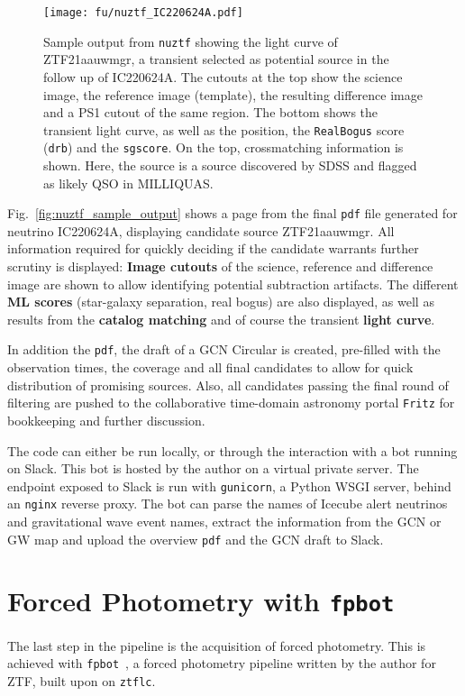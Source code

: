 \begin{figure}[h!]
    \texttt{[image: fu/nuztf\_IC220624A.pdf]}
    \caption[\texttt{nuztf} output]{Sample output from \texttt{nuztf} showing the light curve of ZTF21aauwmgr, a transient selected as potential source in the follow up of IC220624A. The cutouts at the top show the science image, the reference image (template), the resulting difference image and a PS1 cutout of the same region. The bottom shows the transient light curve, as well as the position, the \texttt{RealBogus} score (\texttt{drb}) and the \texttt{sgscore}. On the top, crossmatching information is shown. Here, the source is a source discovered by SDSS and flagged as likely QSO in MILLIQUAS.}
\end{figure}
Fig.~\ref{fig:nuztf_sample_output} shows a page from the final \texttt{pdf} file generated for neutrino IC220624A, displaying candidate source ZTF21aauwmgr. All information required for quickly deciding if the candidate warrants further scrutiny is displayed: \textbf{Image cutouts} of the science, reference and difference image are shown to allow identifying potential subtraction artifacts. The different \textbf{ML scores} (star-galaxy separation, real bogus) are also displayed, as well as results from the \textbf{catalog matching} and of course the transient \textbf{light curve}.

In addition the \texttt{pdf}, the draft of a GCN Circular is created, pre-filled with the observation times, the coverage and all final candidates to allow for quick distribution of promising sources. Also, all candidates passing the final round of filtering are pushed to the collaborative time-domain astronomy portal \texttt{Fritz} for bookkeeping and further discussion.

The code can either be run locally, or through the interaction with a bot running on Slack. This bot is hosted by the author on a virtual private server. The endpoint exposed to Slack is run with \texttt{gunicorn}, a Python WSGI server, behind an \texttt{nginx} reverse proxy. The bot can parse the names of Icecube alert neutrinos and gravitational wave event names, extract the information from the GCN or GW map and upload the overview \texttt{pdf} and the GCN draft to Slack.

\section{Forced Photometry with \texttt{fpbot}}\label{fpbot}
The last step in the pipeline is the acquisition of forced photometry. This is achieved with \texttt{fpbot}~, a forced photometry pipeline written by the author for ZTF, built upon on \texttt{ztflc}.

